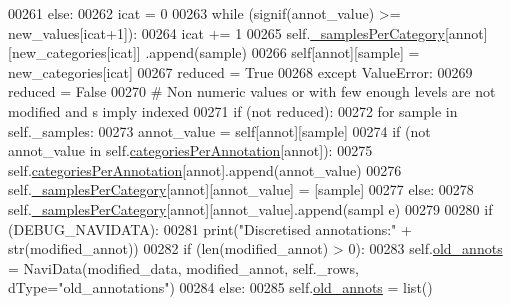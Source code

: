 \begin{DoxyCode}
00261                         \textcolor{keywordflow}{else}:
00262                             icat = 0
00263                             \textcolor{keywordflow}{while} (signif(annot\_value) >= new\_values[icat+1]):
00264                                 icat += 1
00265                             self.\hyperlink{classnavicom_1_1navidata_1_1NaviAnnotations_a44c09a52d1cf049204ae3149fa5a2b34}{_samplesPerCategory}[annot][new\_categories[icat]]
      .append(sample)
00266                             self[annot][sample] = new\_categories[icat]
00267                     reduced = \textcolor{keyword}{True}
00268                 \textcolor{keywordflow}{except} ValueError: 
00269                     reduced = \textcolor{keyword}{False}
00270             \textcolor{comment}{# Non numeric values or with few enough levels are not modified and s
      imply indexed}
00271             \textcolor{keywordflow}{if} (\textcolor{keywordflow}{not} reduced):
00272                 \textcolor{keywordflow}{for} sample \textcolor{keywordflow}{in} self.\_samples:
00273                     annot\_value = self[annot][sample]
00274                     \textcolor{keywordflow}{if} (\textcolor{keywordflow}{not} annot\_value \textcolor{keywordflow}{in} self.\hyperlink{classnavicom_1_1navidata_1_1NaviAnnotations_a1c26e115cb2eabe4384cd2fa0c7f776f}{categoriesPerAnnotation}[annot]):
00275                         self.\hyperlink{classnavicom_1_1navidata_1_1NaviAnnotations_a1c26e115cb2eabe4384cd2fa0c7f776f}{categoriesPerAnnotation}[annot].append(annot\_value)
00276                         self.\hyperlink{classnavicom_1_1navidata_1_1NaviAnnotations_a44c09a52d1cf049204ae3149fa5a2b34}{_samplesPerCategory}[annot][annot\_value] = [sample]
00277                     \textcolor{keywordflow}{else}:
00278                         self.\hyperlink{classnavicom_1_1navidata_1_1NaviAnnotations_a44c09a52d1cf049204ae3149fa5a2b34}{_samplesPerCategory}[annot][annot\_value].append(sampl
      e)
00279 
00280         \textcolor{keywordflow}{if} (DEBUG\_NAVIDATA):
00281             \textcolor{keywordflow}{print}(\textcolor{stringliteral}{"Discretised annotations:"} + str(modified\_annot))
00282         \textcolor{keywordflow}{if} (len(modified\_annot) > 0):
00283             self.\hyperlink{classnavicom_1_1navidata_1_1NaviAnnotations_ab053ca65505c1a9d72e2afb96ddcae9c}{old_annots} = NaviData(modified\_data, modified\_annot, self.\_rows,
       dType=\textcolor{stringliteral}{"old\_annotations"})
00284         \textcolor{keywordflow}{else}:
00285             self.\hyperlink{classnavicom_1_1navidata_1_1NaviAnnotations_ab053ca65505c1a9d72e2afb96ddcae9c}{old_annots} = list()

\end{DoxyCode}
